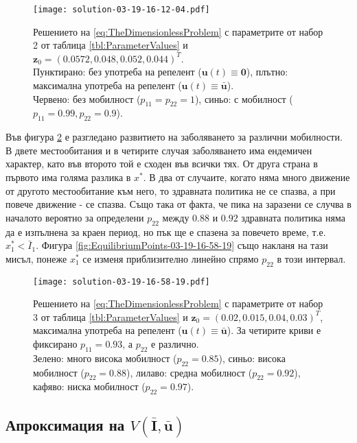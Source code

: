 \begin{figure}[H]
  \centering
  \texttt{[image: solution-03-19-16-12-04.pdf]}
  \caption{Решението на \eqref{eq:TheDimensionlessProblem} с параметрите от набор 2 от таблица \ref{tbl:ParameterValues} и $\mathbf{z}_0=(0.0572, 0.048, 0.052, 0.044)^T$.\\
    Пунктирано: без употреба на репелент ($\mathbf{u}(t) \equiv \mathbf{0}$), плътно: максимална употреба на репелент ($\mathbf{u}(t) \equiv \bar{\mathbf{u}}$).\\
  Червено: без мобилност ($p_{11}=p_{22}=1$), синьо: с мобилност ($p_{11}=0.99, p_{22}=0.9$).}
  \label{fig:Solution-03-19-16-12-04}
\end{figure}

Във фигура \ref{fig:Solution-03-19-16-58-19} е разгледано развитието на заболяването за различни мобилности.
В двете местообитания и в четирите случая заболяването има ендемичен характер, като във второто той е сходен във всички тях.
От друга страна в първото има голяма разлика в $x^*$.
В два от случаите, когато няма много движение от другото местообитание към него, то здравната политика не се спазва, а при повече движение - се спазва.
Също така от факта, че пика на заразени се случва в началото вероятно за определени $p_{22}$ между $0.88$ и $0.92$ здравната политика няма да е изпълнена за краен период, но пък ще е спазена за повечето време, т.е. $x_1^* < \bar{I}_1$. Фигура \ref{fig:EquilibriumPoints-03-19-16-58-19} също накланя на тази мисъл, понеже $x_1^*$ се изменя приблизително линейно спрямо $p_{22}$ в този интервал.

\begin{figure}[H]
  \centering
  \texttt{[image: solution-03-19-16-58-19.pdf]}
  \caption{Решението на \eqref{eq:TheDimensionlessProblem} с параметрите от набор 3 от таблица \ref{tbl:ParameterValues} и $\mathbf{z}_0=(0.02, 0.015, 0.04, 0.03)^T$, максимална употреба на репелент ($\mathbf{u}(t) \equiv \bar{\mathbf{u}}$).
    За четирите криви е фиксирано $p_{11}=0.93$, а $p_{22}$ е различно.\\
  Зелено: много висока мобилност ($p_{22}=0.85$), синьо: висока мобилност ($p_{22}=0.88$), лилаво: средна мобилност ($p_{22}=0.92$), кафяво: ниска мобилност ($p_{22}=0.97$).}
  \label{fig:Solution-03-19-16-58-19}
\end{figure}

\subsection{Апроксимация на $V(\bar{\mathbf{I}}, \bar{\mathbf{u}})$}

